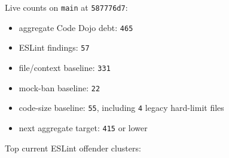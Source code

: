 Live counts on \texttt{m\allowbreak{}a\allowbreak{}i\allowbreak{}n} at \texttt{5\allowbreak{}8\allowbreak{}7\allowbreak{}7\allowbreak{}7\allowbreak{}6\allowbreak{}d\allowbreak{}7}:

\begin{itemize}
\tightlist
\item
  aggregate Code Dojo debt: \texttt{4\allowbreak{}6\allowbreak{}5}
\item
  ESLint findings: \texttt{5\allowbreak{}7}
\item
  file/context baseline: \texttt{3\allowbreak{}3\allowbreak{}1}
\item
  mock-ban baseline: \texttt{2\allowbreak{}2}
\item
  code-size baseline: \texttt{5\allowbreak{}5}, including \texttt{4} legacy hard-limit files
\item
  next aggregate target: \texttt{4\allowbreak{}1\allowbreak{}5} or lower
\end{itemize}

Top current ESLint offender clusters:

